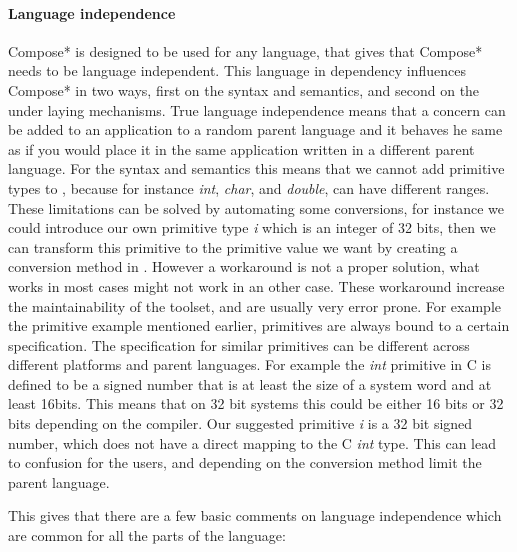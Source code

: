 \paragraph{Language independence} Compose* is designed to be used for any language, that gives that Compose* needs to be language independent. 
This language in dependency influences Compose* in two ways, first on the syntax and semantics, and second on the under laying mechanisms. 
True language independence means that a concern can be added to an application to a random parent language and it behaves he same as if you would place it in the same application written in a different parent language. 
For the syntax and semantics this means that we cannot add primitive types to \Compose*, because for instance \emph{int}, \emph{char}, and \emph{double}, can have different ranges.
These limitations can be solved by automating some conversions, for instance we could introduce our own primitive type \emph{i} which is an integer of 32 bits, then we can transform this primitive to the primitive value we want by creating a conversion method in \Compose*. 
However a workaround is not a proper solution, what works in most cases might not work in an other case.
These workaround increase the maintainability of the toolset, and are usually very error prone.
For example the primitive example mentioned earlier, primitives are always bound to a certain specification.
The specification for similar primitives can be different across different platforms and parent languages.
For example the \emph{int} primitive in C is defined to be a signed number that is at least the size of a system word and at least 16bits. 
This means that on 32 bit systems this could be either 16 bits or 32 bits depending on the compiler.
Our suggested primitive \emph{i} is a 32 bit signed number, which does not have a direct mapping to the C \emph{int} type.
This can lead to confusion for the \Compose* users, and depending on the conversion method limit the parent language.

This gives that there are a few basic comments on language independence which are common for all the parts of the
\Compose* language:

